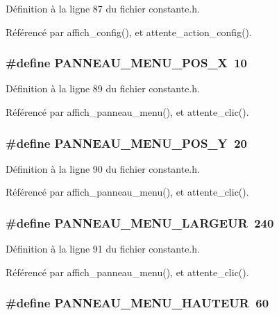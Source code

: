 D\'{e}finition \`{a} la ligne 87 du fichier constante.h.

R\'{e}f\'{e}renc\'{e} par affich\_\-config(), et attente\_\-action\_\-config().
\subsubsection{\setlength{\rightskip}{0pt plus 5cm}\#define PANNEAU\_\-MENU\_\-POS\_\-X~10}\label{constante_8h_811e1cd2c6a50994e18f325ac59e437d}




D\'{e}finition \`{a} la ligne 89 du fichier constante.h.

R\'{e}f\'{e}renc\'{e} par affich\_\-panneau\_\-menu(), et attente\_\-clic().
\subsubsection{\setlength{\rightskip}{0pt plus 5cm}\#define PANNEAU\_\-MENU\_\-POS\_\-Y~20}\label{constante_8h_325a11ee13a243509c6f14be48c14df8}




D\'{e}finition \`{a} la ligne 90 du fichier constante.h.

R\'{e}f\'{e}renc\'{e} par affich\_\-panneau\_\-menu(), et attente\_\-clic().
\subsubsection{\setlength{\rightskip}{0pt plus 5cm}\#define PANNEAU\_\-MENU\_\-LARGEUR~240}\label{constante_8h_db8812349c202dbe37f9fa7214b5e0a2}




D\'{e}finition \`{a} la ligne 91 du fichier constante.h.

R\'{e}f\'{e}renc\'{e} par affich\_\-panneau\_\-menu(), et attente\_\-clic().
\subsubsection{\setlength{\rightskip}{0pt plus 5cm}\#define PANNEAU\_\-MENU\_\-HAUTEUR~60}\label{constante_8h_22c7d84855223264b6b5c4471e229c57}




